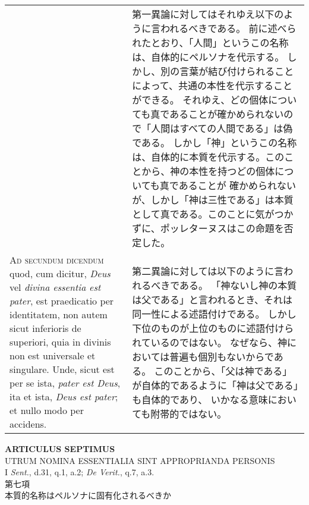 \documentclass[10pt]{jsarticle} %
\begin{document}
\begin{longtable}{p{21em}p{21em}}
&

第一異論に対してはそれゆえ以下のように言われるべきである。
前に述べられたとおり、「人間」というこの名称は、自体的にペルソナを代示する。
しかし、別の言葉が結び付けられることによって、共通の本性を代示することができる。
それゆえ、どの個体についても真であることが確かめられないので「人間はすべての人間である」は偽である。
しかし「神」というこの名称は、自体的に本質を代示する。このことから、神の本性を持つどの個体についても真であることが
確かめられないが、しかし「神は三性である」は本質として真である。このことに気がつかずに、ポッレターヌスはこの命題を否定した。

\\

\textsc{Ad secundum dicendum} quod, cum dicitur, \textit{Deus} vel \textit{divina essentia est pater}, est
praedicatio per identitatem, non autem sicut inferioris de superiori, quia in
divinis non est universale et singulare. Unde, sicut est per se ista, \textit{pater est
Deus}, ita et ista, \textit{Deus est pater}; et nullo modo per accidens.


&

第二異論に対しては以下のように言われるべきである。
「神ないし神の本質は父である」と言われるとき、それは同一性による述語付けである。
しかし下位のものが上位のものに述語付けられているのではない。
なぜなら、神においては普遍も個別もないからである。
このことから、「父は神である」が自体的であるように「神は父である」も自体的であり、
いかなる意味においても附帯的ではない。


\end{longtable}
\newpage
{}
\begin{center}
 {\Large {\bf ARTICULUS SEPTIMUS}}\\
 {\large UTRUM NOMINA ESSENTIALIA SINT APPROPRIANDA PERSONIS}\\
 {\footnotesize I \textit{Sent.}, d.31, q.1, a.2; \textit{De Verit.}, q.7, a.3.}\\
 {\Large 第七項\\本質的名称はペルソナに固有化されるべきか}
\end{center}
\end{document}
